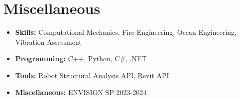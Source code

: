 \documentclass[12pt]{article}
\begin{document}
\section{Miscellaneous}
\begin{itemize}
    \itemsep=-.3em
    \item \textbf{Skills:} Computational Mechanics, Fire Engineering, Ocean Engineering, Vibration Assessment
    \item \textbf{Programming:} C++, Python, C\#, .NET
    \item \textbf{Tools:} Robot Structural Analysis API, Revit API
    \item \textbf{Miscellaneous:} ENVISION SP 2023-2024
\end{itemize}
\end{document}
